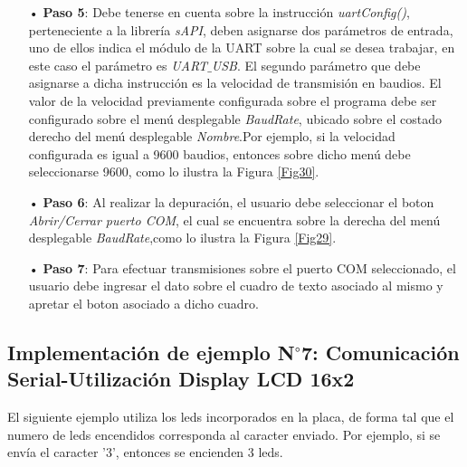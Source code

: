 \documentclass[12pt,letterpaper]{article}
\begin{document}
\begin{enumerate}
\item[•]\textbf{Paso 5}: Debe tenerse en cuenta sobre la instrucción \textit{uartConfig()}, perteneciente a la librería \textit{sAPI}, deben asignarse dos parámetros de entrada, uno de ellos indica el módulo de la UART sobre la cual se desea trabajar, en este caso el parámetro es \textit{UART$\_$USB}. El segundo parámetro que debe asignarse a dicha instrucción es la velocidad de transmisión en baudios. El valor de la velocidad previamente configurada sobre el programa debe ser configurado sobre el menú desplegable \textit{BaudRate}, ubicado sobre el costado derecho del menú desplegable \textit{Nombre}.Por ejemplo, si la velocidad configurada es igual a 9600 baudios, entonces sobre dicho menú debe seleccionarse 9600, como lo ilustra la Figura \ref{Fig30}.
\item[•]\textbf{Paso 6}: Al realizar la depuración, el usuario debe seleccionar el boton \textit{Abrir/Cerrar puerto COM}, el cual se encuentra sobre la derecha del menú desplegable \textit{BaudRate},como lo ilustra la Figura \ref{Fig29}.
\item[•]\textbf{Paso 7}: Para efectuar transmisiones sobre el puerto COM seleccionado, el usuario debe ingresar el dato sobre el cuadro de texto asociado al mismo y apretar el boton asociado a dicho cuadro.
\end{enumerate}

\subsection{Implementación de ejemplo N$^{\circ}$7: Comunicación Serial-Utilización Display LCD 16x2}
El siguiente ejemplo utiliza los leds incorporados en la placa, de forma tal que el numero de leds encendidos corresponda al caracter enviado. Por ejemplo, si se envía el caracter '3', entonces se encienden 3 leds.
\end{document}
